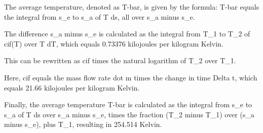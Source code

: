The average temperature, denoted as T-bar, is given by the formula:
T-bar equals the integral from s_e to s_a of T ds, all over s_a minus s_e.

The difference s_a minus s_e is calculated as the integral from T_1 to T_2 of cif(T) over T dT, which equals 0.73376 kilojoules per kilogram Kelvin.

This can be rewritten as cif times the natural logarithm of T_2 over T_1.

Here, cif equals the mass flow rate dot m times the change in time Delta t, which equals 21.66 kilojoules per kilogram Kelvin.

Finally, the average temperature T-bar is calculated as the integral from s_e to s_a of T ds over s_a minus s_e, times the fraction (T_2 minus T_1) over (s_a minus s_e), plus T_1, resulting in 254.514 Kelvin.